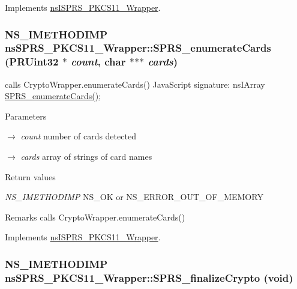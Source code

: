 Implements \hyperlink{classnsISPRS__PKCS11__Wrapper}{nsISPRS\_\-PKCS11\_\-Wrapper}.\hypertarget{classnsSPRS__PKCS11__Wrapper_aacfd858ce01bfef5569c28b8f91b4f90}{
\subsubsection[{SPRS\_\-enumerateCards}]{\setlength{\rightskip}{0pt plus 5cm}NS\_\-IMETHODIMP nsSPRS\_\-PKCS11\_\-Wrapper::SPRS\_\-enumerateCards (PRUint32 $\ast$ {\em count}, \/  char $\ast$$\ast$$\ast$ {\em cards})}}
\label{classnsSPRS__PKCS11__Wrapper_aacfd858ce01bfef5569c28b8f91b4f90}


calls CryptoWrapper.enumerateCards() JavaScript signature: nsIArray \hyperlink{classnsSPRS__PKCS11__Wrapper_aacfd858ce01bfef5569c28b8f91b4f90}{SPRS\_\-enumerateCards()};


\begin{DoxyParams}{Parameters}
\item[\mbox{$\rightarrow$} {\em count}]number of cards detected \item[\mbox{$\rightarrow$} {\em cards}]array of strings of card names \end{DoxyParams}

\begin{DoxyRetVals}{Return values}
\item[{\em NS\_\-IMETHODIMP}]NS\_\-OK or NS\_\-ERROR\_\-OUT\_\-OF\_\-MEMORY \end{DoxyRetVals}
\begin{DoxyRemark}{Remarks}
calls CryptoWrapper.enumerateCards() 
\end{DoxyRemark}


Implements \hyperlink{classnsISPRS__PKCS11__Wrapper}{nsISPRS\_\-PKCS11\_\-Wrapper}.\hypertarget{classnsSPRS__PKCS11__Wrapper_ab27291133f224017cdaadcceaa0b52c8}{
\subsubsection[{SPRS\_\-finalizeCrypto}]{\setlength{\rightskip}{0pt plus 5cm}NS\_\-IMETHODIMP nsSPRS\_\-PKCS11\_\-Wrapper::SPRS\_\-finalizeCrypto (void)}}
\label{classnsSPRS__PKCS11__Wrapper_ab27291133f224017cdaadcceaa0b52c8}


